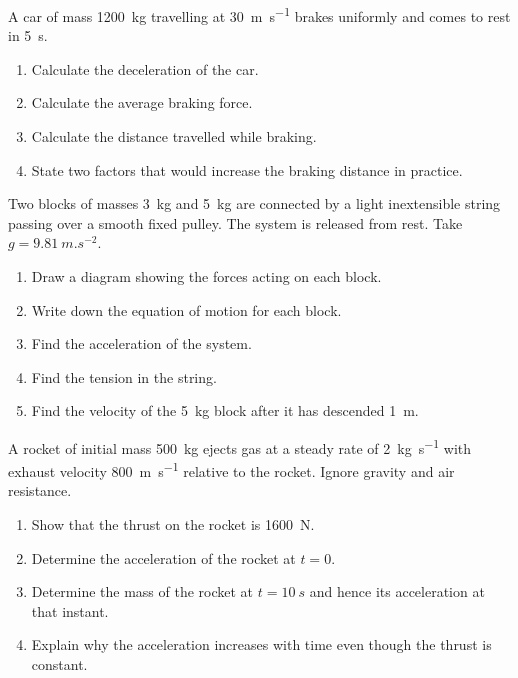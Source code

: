 \documentclass[11pt]{article}
\newcounter{popsec}
\newcounter{popsub}
\newcommand{\courssub}[1]{%
  \stepcounter{popsub}%
  \par\vspace{9pt}\noindent{\popxbold\fontsize{11.5}{13}\selectfont\color{popink}{\color{poporange}\thepopsec.\thepopsub}\hspace{6pt}#1}\par\nopagebreak\vspace{4pt}
}
\begin{document}
\courssub{I practise}

\begin{exercice}
A car of mass \SI{1200}{kg} travelling at \SI{30}{m.s^{-1}} brakes uniformly and comes to rest in \SI{5}{s}.
\begin{enumerate}
\item Calculate the deceleration of the car.
\item Calculate the average braking force.
\item Calculate the distance travelled while braking.
\item State two factors that would increase the braking distance in practice.
\end{enumerate}
\end{exercice}

\begin{exercice}
Two blocks of masses \SI{3}{kg} and \SI{5}{kg} are connected by a light inextensible string passing over a smooth fixed pulley. The system is released from rest. Take $g = \SI{9.81}{m.s^{-2}}$.
\begin{enumerate}
\item Draw a diagram showing the forces acting on each block.
\item Write down the equation of motion for each block.
\item Find the acceleration of the system.
\item Find the tension in the string.
\item Find the velocity of the \SI{5}{kg} block after it has descended \SI{1}{m}.
\end{enumerate}
\end{exercice}

\begin{exercice}
A rocket of initial mass \SI{500}{kg} ejects gas at a steady rate of \SI{2}{kg.s^{-1}} with exhaust velocity \SI{800}{m.s^{-1}} relative to the rocket. Ignore gravity and air resistance.
\begin{enumerate}
\item Show that the thrust on the rocket is \SI{1600}{N}.
\item Determine the acceleration of the rocket at $t = 0$.
\item Determine the mass of the rocket at $t = \SI{10}{s}$ and hence its acceleration at that instant.
\item Explain why the acceleration increases with time even though the thrust is constant.
\end{enumerate}
\end{exercice}
\end{document}

